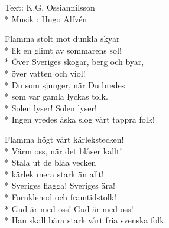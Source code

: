 \begin{SongText}
    \begin{SongInfo}
        Text: K.G. Ossiannilsson\\*%
        Musik : Hugo Alfvén
    \end{SongInfo}
    \begin{SongVerse}
        Flamma stolt mot dunkla skyar\\*%
        lik en glimt av sommarens sol!\\*%
        Över Sveriges skogar, berg och byar,\\*%
        över vatten och viol!\\*%
        Du som sjunger, när Du bredes\\*%
        som vår gamla lyckas tolk.\\*%
        Solen lyser! Solen lyser!\\*%
        Ingen vredes åska slog vårt tappra folk!
    \end{SongVerse}
    \begin{SongVerse}
        Flamma högt vårt kärlekstecken!\\*%
        Värm oss, när det blåser kallt!\\*%
        Ståla ut de blåa vecken\\*%
        kärlek mera stark än allt!\\*%
        Sveriges flagga! Sveriges ära!\\*%
        Fornklenod och framtidstolk!\\*%
        Gud är med oss! Gud är med oss!\\*%
        Han skall bära stark vårt fria svenska folk
    \end{SongVerse}
\end{SongText}